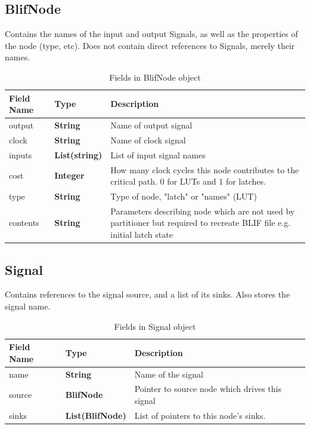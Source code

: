 \documentclass[12pt,final,oneside]{dwThesis} %
\begin{document}
   \subsection{BlifNode}
   Contains the names of the input and output Signals, as well as the properties of the node (type, etc).
   Does not contain direct references to Signals, merely their names.
   \begin{table}
      \begin{tabularx}{\linewidth}{llX}
         \toprule
         Field Name & Type & Description\\
         \midrule
         output & \textbf{ String} & Name of output signal \\
         clock & \textbf{ String} & Name of clock signal \\
         inputs & \textbf{List(string)} & List of input signal names \\
         cost & \textbf{ Integer} & How many clock cycles this node contributes to the critical path. 0 for \acp{LUT} and 1 for latches. \\
         type & \textbf{ String} & Type of node, "latch" or "names" (\ac{LUT}) \\
         contents & \textbf{ String} & Parameters describing node which are not used by partitioner but required to recreate \ac{BLIF} file e.g. initial latch state\\
         \bottomrule
      \end{tabularx}
      \caption{Fields in BlifNode object}
   \end{table}

   \subsection{Signal}
   Contains references to the signal source, and a list of its sinks. Also stores the signal name.
   \begin{table}
      \begin{tabularx}{\linewidth}{llX}
         \toprule
         Field Name & Type & Description\\
         \midrule
         name & \textbf{ String} & Name of the signal \\
         source & \textbf{BlifNode} & Pointer to source node which drives this signal \\
         sinks & \textbf{List(BlifNode)} & List of pointers to this node's sinks.\\
         \bottomrule
      \end{tabularx}
      \caption{Fields in Signal object}
   \end{table}
\end{document}
